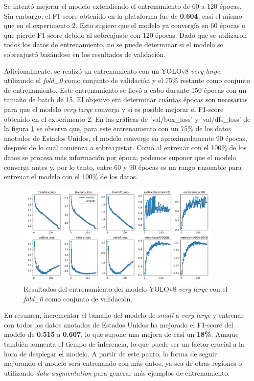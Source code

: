 Se intentó mejorar el modelo extendiendo el entrenamiento de 60 a 120 épocas. Sin embargo, el F1-score obtenido en la plataforma fue de \textbf{0.604}, casi el mismo que en el experimento 2. Esto sugiere que el modelo ya convergía en 60 épocas o que pierde F1-score debido al sobreajuste con 120 épocas. Dado que se utilizaron todos los datos de entrenamiento, no se puede determinar si el modelo se sobreajustó basándose en los resultados de validación.

Adicionalmente, se realizó un entrenamiento con un YOLOv8 \textit{very large}, utilizando el \textit{fold\_0} como conjunto de validación y el 75\% restante como conjunto de entrenamiento. Este entrenamiento se llevó a cabo durante 150 épocas con un tamaño de batch de 15. El objetivo era determinar cuántas épocas son necesarias para que el modelo \textit{very large} converja y si es posible mejorar el F1-score obtenido en el experimento 2. En las gráficas de 'val/box\_loss' y 'val/dfs\_loss' de la figura \ref{fig:exp2b-results} se observa que, para este entrenamiento con un 75\% de los datos anotados de Estados Unidos, el modelo converge en aproximadamente 90 épocas, después de lo cual comienza a sobreajustar. Como al entrenar con el 100\% de los datos se procesa más información por época, podemos suponer que el modelo converge antes y, por lo tanto, entre 60 y 90 épocas es un rango razonable para entrenar el modelo con el 100\% de los datos.

\begin{figure}[H]
    \centering
    \includegraphics[width=0.9\textwidth]{img/exp2b-results.png}
    \caption{Resultados del entrenamiento del modelo YOLOv8 \textit{very large} con el \textit{fold\_0} como conjunto de validación.}
    \label{fig:exp2b-results}
\end{figure}

En resumen, incrementar el tamaño del modelo de \textit{small} a \textit{very large} y entrenar con todos los datos anotados de Estados Unidos ha mejorado el F1-score del modelo de \textbf{0.515} a \textbf{0.607}, lo que supone una mejora de casi un \textbf{18\%}. Aunque también aumenta el tiempo de inferencia, lo que puede ser un factor crucial a la hora de desplegar el modelo. A partir de este punto, la forma de seguir mejorando el modelo será entrenando con más datos, ya sea de otras regiones o utilizando \textit{data augmentation} para generar más ejemplos de entrenamiento.


